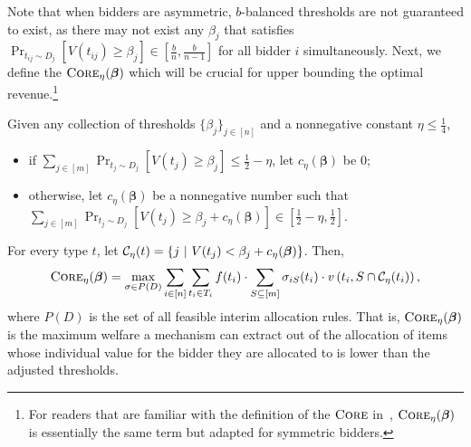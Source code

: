 Note that when bidders are asymmetric, $b$-balanced thresholds are not guaranteed to exist, as there may not exist any $\beta_j$ that satisfies $\Pr_{t_{ij}\sim D_j}\left [V(t_{ij})\geq \beta_j\right]\in[\frac{b}{n},\frac{b}{n-1}]$ for all bidder $i$ simultaneously. Next, we define the $\textsc{Core}_\eta(\boldsymbol{\beta})$ which will be crucial for upper bounding the optimal revenue.\footnote{For readers that are familiar with the definition of the $\textsc{Core}$ in~\cite{CaiZ17}, $\textsc{Core}_\eta(\boldsymbol{\beta})$ is essentially the same term but adapted for symmetric bidders.}

\begin{definition}[\core]\label{def:core and tail}
Given any collection of %
 thresholds $\{\beta_j\}_{j\in[n]}$ and a nonnegative constant $\eta\leq \frac{1}{4}$, \begin{itemize}
	\item if $\sum_{j\in[m]} \Pr_{t_{j}\sim D_{j}}\left[V(t_{j})\geq \beta_{j}\right]\leq \frac{1}{2}-\eta$, let $c_\eta(\boldsymbol{\beta})$ be $0$;
	\item otherwise, let $c_\eta(\boldsymbol{\beta})$ be a nonnegative number such that $\sum_{j\in[m]} \Pr_{t_{j}\sim D_{j}}\left[V(t_{j})\geq \beta_{j}+c_\eta(\boldsymbol{\beta})\right]\in  \left[\frac{1}{2}-\eta, \frac{1}{2}\right]$.
\end{itemize}
For every type $t$, let $\mathcal{C}_{\eta}(t)=\{j\ |\ V(t_{ j})< \beta_{j}+c_\eta(\boldsymbol{\beta})\}$. Then, 
$$\textsc{Core}_\eta(\boldsymbol{\beta})= \max_{\sigma \in P(D)} \sum_{i\in[n]}\sum_{t_i\in T_i}f(t_i)\cdot \sum_{S\subseteq[m]}\sigma_{iS}(t_i)\cdot v\left(t_i,S\cap \mathcal{C}_{\eta}(t_i)\right),$$ where $P(D)$ is the set of all feasible interim allocation rules. That is, {$\textsc{Core}_\eta(\boldsymbol{\beta})$ is the maximum welfare a mechanism can extract out of the allocation of items whose individual value for the bidder they are allocated to is lower than the adjusted thresholds.}
\end{definition}


